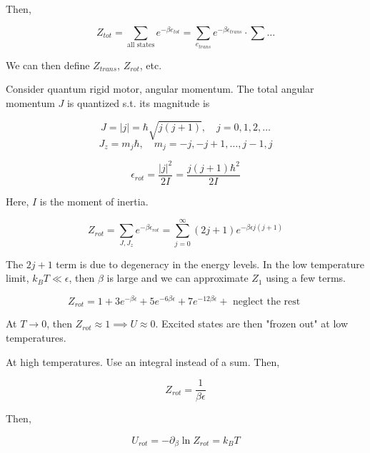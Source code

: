 \documentclass{article}
\newtheorem{one minute paper}[theorem]{One Minute Paper}
\begin{document}
Then,

\begin{equation}
    Z_{tot} = \sum_{\text{all states}}e^{-\beta e_{tot}} = \sum_{e_{trans}}e^{-\beta\epsilon_{trans}} \cdot \sum \dots
\end{equation}

We can then define $Z_{trans}$, $Z_{rot}$, etc.

Consider quantum rigid motor, angular momentum. The total angular momentum $J$ is quantized s.t. its magnitude is 

\begin{equation}
    J = |j| = \hbar\sqrt{j(j+1)}, \quad j = 0,1,2,\dots
\end{equation}
\begin{equation}
    J_z = m_j \hbar, \quad m_j = -j, -j+1, \dots, j-1, j
\end{equation}

\begin{equation}
    \epsilon_{rot} = \frac{|j|^2}{2I} = \frac{j(j+1)\hbar^2}{2I}
\end{equation}

Here, $I$ is the moment of inertia. 

\begin{equation}
    Z_{rot} = \sum_{J, J_z}e^{-\beta \epsilon_{rot}} = \sum_{j=0}^{\infty}(2j + 1)e^{-\beta \epsilon j(j+1)}
\end{equation}

The $2j + 1$ term is due to degeneracy in the energy levels. In the low temperature limit, $k_B T \ll \epsilon$, then $\beta$ is large and we can approximate $Z_1$ using a few terms. 

\begin{equation}
    Z_{rot} = 1 + 3e^{-\beta \epsilon} + 5 e^{-6\beta \epsilon} + 7e^{-12 \beta \epsilon} + \text{ neglect the rest } 
\end{equation}

At $T \rightarrow 0$, then $Z_{rot} \approx 1 \implies U \approx 0$. Excited states are then "frozen out" at low temperatures. 

At high temperatures. Use an integral instead of a sum. Then, 

\begin{equation}
    Z_{rot} = \frac{1}{\beta \epsilon}
\end{equation}

Then,

\begin{equation}
    U_{rot} = -\partial_{\beta}\ln Z_{rot} = k_B T
\end{equation}
\end{document}
